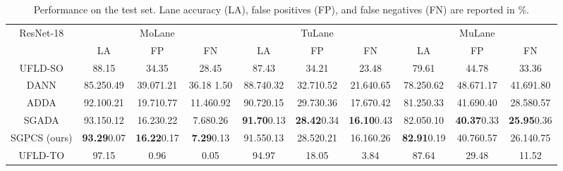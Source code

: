 \documentclass{article}
\begin{document}
	\begin{table}
		\caption{Performance on the test set. Lane accuracy (LA), false positives (FP), and false negatives (FN) are reported in \%.}
		\label{table:Results}
		\tiny
		\centering
		\setlength{\tabcolsep}{4.6pt}
		\begin{tabular}{c|ccc|ccc|ccc}
			\toprule
			\multirow{2}{*}{ResNet-18} & \multicolumn{3}{c|}{MoLane}       & \multicolumn{3}{c|}{TuLane}                       & \multicolumn{3}{c}{MuLane} \\
			& LA           & FP & FN         & LA            & FP    &  FN                      & LA       & FP    &  FN   \\
			\midrule
			UFLD-SO                   & 88.15          & 34.35  &  28.45        & 87.43           & 34.21 & 23.48                    & 79.61      & 44.78 & 33.36 \\
			DANN \cite{Ganin2016}     & 85.250.49 & 39.071.21  & 36.18 1.50 & 88.740.32 & 32.710.52  & 21.640.65  & 78.250.62 & 48.671.17 & 41.691.80  \\
			ADDA \cite{Tzeng2017ADDA} & 92.100.21 & 19.710.77  & 11.460.92 & 90.720.15 & 29.730.36  & 17.670.42  & 81.250.33 & 41.690.40 & 28.580.57   \\
			SGADA \cite{sgada2021}    & 93.150.12 & 16.230.22 & 7.680.26 & \textbf{91.70}0.13 & \textbf{28.42}0.34 & \textbf{16.10}0.43 & 82.050.10 & \textbf{40.37}0.33 & \textbf{25.95}0.36\\
			SGPCS (ours)                & \textbf{93.29}0.07 & \textbf{16.22}0.17 & \textbf{7.29}0.13  & 91.550.13 & 28.520.21 & 16.160.26 & \textbf{82.91}0.19 & 40.760.57 & 26.140.75\\
			\midrule
			UFLD-TO                   & 97.15           & 0.96  &    0.05       &  94.97          & 18.05           & 3.84          & 87.64  & 29.48 & 11.52 \\ 
			
			\midrule
			\midrule
			

\end{tabular}
\end{table}
\end{document}
